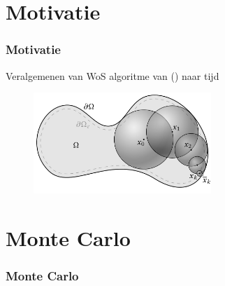 \documentclass[18pt,aspectratio=149]{beamer}
\begin{document}
\section{Motivatie}
\begin{frame}
    \frametitle{Motivatie}
    Veralgemenen van WoS algoritme van (\cite{sawhney_grid-free_2022})
    naar tijd
    \vspace{-0.25cm}
    \begin{figure}[h!]
        \centering
        \includegraphics[width=0.6\textwidth]{imgs/Walk_on_Spheres_illustration.jpg}
        \label{fig:Walk_on_Spheres_illustration.jpg}
    \end{figure}
\end{frame}

\section{Monte Carlo}
\begin{frame}
    \frametitle{Monte Carlo}
    \tableofcontentscurrent
\end{frame}



\end{document}
